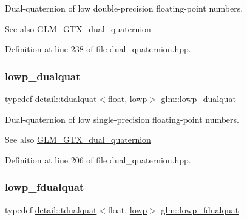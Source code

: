 Dual-\/quaternion of low double-\/precision floating-\/point numbers.

\begin{DoxySeeAlso}{See also}
\hyperlink{group__gtc__dual__quaternion}{G\+L\+M\+\_\+\+G\+T\+X\+\_\+dual\+\_\+quaternion} 
\end{DoxySeeAlso}


Definition at line 238 of file dual\+\_\+quaternion.\+hpp.

\mbox{\label{group__gtc__dual__quaternion_gae1772179edc60f4e8b46c8772eeeccee}} 
\subsubsection{\texorpdfstring{lowp\+\_\+dualquat}{lowp\_dualquat}}
{\footnotesize\ttfamily typedef \hyperlink{structglm_1_1detail_1_1tdualquat}{detail\+::tdualquat}$<$float, \hyperlink{namespaceglm_a0f04f086094c747d227af4425893f545ae161af3fc695e696ce3bf69f7332bc2d}{lowp}$>$ \hyperlink{group__gtc__dual__quaternion_gae1772179edc60f4e8b46c8772eeeccee}{glm\+::lowp\+\_\+dualquat}}

Dual-\/quaternion of low single-\/precision floating-\/point numbers.

\begin{DoxySeeAlso}{See also}
\hyperlink{group__gtc__dual__quaternion}{G\+L\+M\+\_\+\+G\+T\+X\+\_\+dual\+\_\+quaternion} 
\end{DoxySeeAlso}


Definition at line 206 of file dual\+\_\+quaternion.\+hpp.

\mbox{\label{group__gtc__dual__quaternion_gae62c636c63c9eb3c1ea6d10f4b7d7c81}} 
\subsubsection{\texorpdfstring{lowp\+\_\+fdualquat}{lowp\_fdualquat}}
{\footnotesize\ttfamily typedef \hyperlink{structglm_1_1detail_1_1tdualquat}{detail\+::tdualquat}$<$float, \hyperlink{namespaceglm_a0f04f086094c747d227af4425893f545ae161af3fc695e696ce3bf69f7332bc2d}{lowp}$>$ \hyperlink{group__gtc__dual__quaternion_gae62c636c63c9eb3c1ea6d10f4b7d7c81}{glm\+::lowp\+\_\+fdualquat}}


